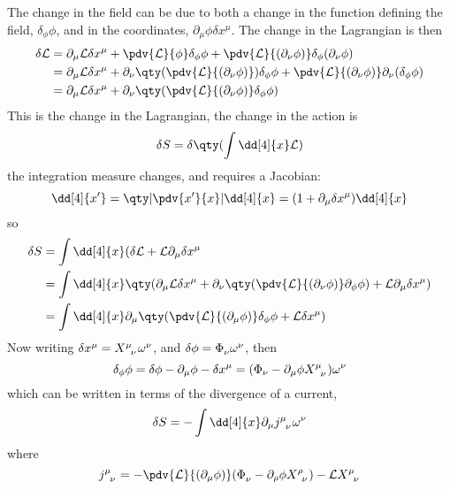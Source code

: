 The change in the field can be due to both a change in the function
defining the field, $\delta_{\phi} \phi$, and in the coordinates,
$\partial_{\mu} \phi \delta x^{\mu}$. The change in the Lagrangian is
then
\begin{align*}
  \delta \Lag &= \partial_{\mu} \Lag \delta x^{\mu} + \pdv{\Lag}{\phi} \delta_{\phi}\phi + \pdv{\Lag}{(\partial_{\nu} \phi)} \delta_{\phi} (\partial_{\nu} \phi) \\
&= \partial_{\mu} \Lag \delta x^{\mu} + \partial_{\nu} \qty( \pdv{\Lag}{(\partial_{\nu} \phi)}) \delta_{\phi} \phi + \pdv{\Lag}{(\partial_{\nu} \phi)} \partial_{\nu} (\delta_{\phi} \phi ) \\ 
&= \partial_{\mu} \Lag \delta x^{\mu} + \partial_{\nu} \qty( \pdv{\Lag}{(\partial_{\nu} \phi )} \delta_{\phi} \phi )
\end{align*}
This is the change in the Lagrangian, the change in the action is 
\begin{equation}
  \label{eq:4}
  \delta S = \delta \qty( \int \dd[4]{x} \Lag )
\end{equation}
the integration measure changes, and requires a Jacobian:
\[ \dd[4]{x^{\prime}} = \qty| \pdv{x^{\prime}}{x} | \dd[4]{x} =
(1+ \partial_{\mu} \delta x^{\mu} ) \dd[4]{x} \]
so
\begin{align*}
  \delta S &= \int \dd[4]{x} (\delta \Lag + \Lag \partial_{\mu} \delta x^{\mu} \\
  &= \int \dd[4]{x} \qty( \partial_{\mu} \Lag \delta x^{\mu}
  + \partial_{\nu} \qty( \pdv{\Lag}{(\partial_{\nu}
    \phi)} \partial_{\phi} \phi ) + \Lag \partial_{\mu} \delta x^{\mu}
  ) \\ &= \int \dd[4]{x} \partial_{\mu} \qty( \pdv{\Lag}{(\partial_{\mu} \phi)} \delta_{\phi} \phi + \Lag \delta x^{\mu} )
\end{align*}
Now writing $\delta x^{\mu} = \tensor{X}{^{\mu}_{\nu}} \omega^{\nu}$, and $\delta \phi = \tensor{\Phi}{_{\nu}}\omega^{\nu}$, then
\[ \delta_{\phi} \phi = \delta \phi - \partial_{\mu} \phi - \delta x^{\mu} = (\Phi_{\nu} - \partial_{\mu} \phi \tensor{X}{^{\mu}_{\nu}} ) \omega^{\nu} \]
which can be written in terms of the divergence of a current,
\[ \delta S = - \int \dd[4]{x} \partial_{\mu} \tensor{j}{^{\mu}_{\nu}}
\omega^{\nu} \]
where
\begin{equation}
  \label{eq:5}
  \tensor{j}{^{\mu}_{\nu}} = - \pdv{\Lag}{(\partial_{\mu} \phi)} 
                          ( \tensor{\Phi}{_{\nu}} - \partial_{\rho} \phi
                            \tensor{X}{^{\rho}_{\nu}}) - \Lag \tensor{X}{^{\mu}_{\nu}}
\end{equation}
